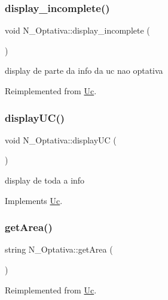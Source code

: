 \subsubsection{\texorpdfstring{display\+\_\+incomplete()}{display\_incomplete()}}
{\footnotesize\ttfamily void N\+\_\+\+Optativa\+::display\+\_\+incomplete (\begin{DoxyParamCaption}{ }\end{DoxyParamCaption})\hspace{0.3cm}{\ttfamily [virtual]}}

display de parte da info da uc nao optativa 

Reimplemented from \hyperlink{class_uc_a32e7d62a706731268ef22f5d0c76793f}{Uc}.

\hypertarget{class_n___optativa_a91df0bfdec2f9fd86ccf3f83d23dff4d}{}\label{class_n___optativa_a91df0bfdec2f9fd86ccf3f83d23dff4d} 
\subsubsection{\texorpdfstring{display\+U\+C()}{displayUC()}}
{\footnotesize\ttfamily void N\+\_\+\+Optativa\+::display\+UC (\begin{DoxyParamCaption}{ }\end{DoxyParamCaption})\hspace{0.3cm}{\ttfamily [virtual]}}

display de toda a info 

Implements \hyperlink{class_uc_a9a64416600c67469a285d97a20050dd4}{Uc}.

\hypertarget{class_n___optativa_a43cdb1dcc1c9ec42dd29497c6b4b0dd0}{}\label{class_n___optativa_a43cdb1dcc1c9ec42dd29497c6b4b0dd0} 
\subsubsection{\texorpdfstring{get\+Area()}{getArea()}}
{\footnotesize\ttfamily string N\+\_\+\+Optativa\+::get\+Area (\begin{DoxyParamCaption}{ }\end{DoxyParamCaption})\hspace{0.3cm}{\ttfamily [virtual]}}



Reimplemented from \hyperlink{class_uc_a98e8e68278a1cfb628662ab3d613410f}{Uc}.

